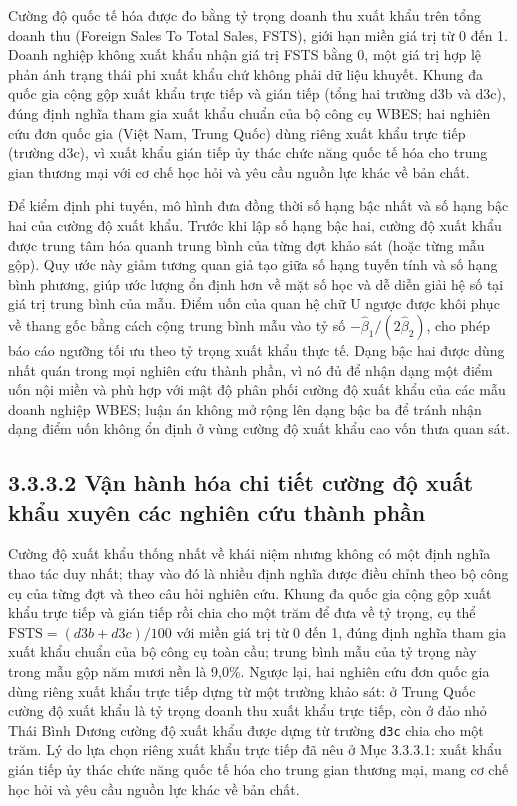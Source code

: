 \documentclass[
  a4paper,
  13pt]{extreport}
\begin{document}
Cường độ quốc tế hóa được đo bằng tỷ trọng doanh thu xuất khẩu trên tổng
doanh thu (Foreign Sales To Total Sales, FSTS), giới hạn miền giá trị từ
0 đến 1. Doanh nghiệp không xuất khẩu nhận giá trị FSTS bằng 0, một giá
trị hợp lệ phản ánh trạng thái phi xuất khẩu chứ không phải dữ liệu
khuyết. Khung đa quốc gia cộng gộp xuất khẩu trực tiếp và gián tiếp
(tổng hai trường d3b và d3c), đúng định nghĩa tham gia xuất khẩu chuẩn
của bộ công cụ WBES; hai nghiên cứu đơn quốc gia (Việt Nam, Trung Quốc)
dùng riêng xuất khẩu trực tiếp (trường d3c), vì xuất khẩu gián tiếp ủy
thác chức năng quốc tế hóa cho trung gian thương mại với cơ chế học hỏi
và yêu cầu nguồn lực khác về bản chất.

Để kiểm định phi tuyến, mô hình đưa đồng thời số hạng bậc nhất và số
hạng bậc hai của cường độ xuất khẩu. Trước khi lập số hạng bậc hai,
cường độ xuất khẩu được trung tâm hóa quanh trung bình của từng đợt khảo
sát (hoặc từng mẫu gộp). Quy ước này giảm tương quan giả tạo giữa số
hạng tuyến tính và số hạng bình phương, giúp ước lượng ổn định hơn về
mặt số học và dễ diễn giải hệ số tại giá trị trung bình của mẫu. Điểm
uốn của quan hệ chữ U ngược được khôi phục về thang gốc bằng cách cộng
trung bình mẫu vào tỷ số \(-\hat\beta_1 / (2\hat\beta_2)\), cho phép báo
cáo ngưỡng tối ưu theo tỷ trọng xuất khẩu thực tế. Dạng bậc hai được
dùng nhất quán trong mọi nghiên cứu thành phần, vì nó đủ để nhận dạng
một điểm uốn nội miền và phù hợp với mật độ phân phối cường độ xuất khẩu
của các mẫu doanh nghiệp WBES; luận án không mở rộng lên dạng bậc ba để
tránh nhận dạng điểm uốn không ổn định ở vùng cường độ xuất khẩu cao vốn
thưa quan sát.

\hypertarget{vux1eadn-huxe0nh-huxf3a-chi-tiux1ebft-cux1b0ux1eddng-ux111ux1ed9-xuux1ea5t-khux1ea9u-xuyuxean-cuxe1c-nghiuxean-cux1ee9u-thuxe0nh-phux1ea7n}{%
\subsection{3.3.3.2 Vận hành hóa chi tiết cường độ xuất khẩu xuyên các
nghiên cứu thành
phần}\label{vux1eadn-huxe0nh-huxf3a-chi-tiux1ebft-cux1b0ux1eddng-ux111ux1ed9-xuux1ea5t-khux1ea9u-xuyuxean-cuxe1c-nghiuxean-cux1ee9u-thuxe0nh-phux1ea7n}}

Cường độ xuất khẩu thống nhất về khái niệm nhưng không có một định nghĩa
thao tác duy nhất; thay vào đó là nhiều định nghĩa được điều chỉnh theo
bộ công cụ của từng đợt và theo câu hỏi nghiên cứu. Khung đa quốc gia
cộng gộp xuất khẩu trực tiếp và gián tiếp rồi chia cho một trăm để đưa
về tỷ trọng, cụ thể \(\mathrm{FSTS} = (d3b + d3c)/100\) với miền giá trị
từ 0 đến 1, đúng định nghĩa tham gia xuất khẩu chuẩn của bộ công cụ toàn
cầu; trung bình mẫu của tỷ trọng này trong mẫu gộp năm mươi nền là
9,0\%. Ngược lại, hai nghiên cứu đơn quốc gia dùng riêng xuất khẩu trực
tiếp dựng từ một trường khảo sát: ở Trung Quốc cường độ xuất khẩu là tỷ
trọng doanh thu xuất khẩu trực tiếp, còn ở đảo nhỏ Thái Bình Dương cường
độ xuất khẩu được dựng từ trường \texttt{d3c} chia cho một trăm. Lý do
lựa chọn riêng xuất khẩu trực tiếp đã nêu ở Mục 3.3.3.1: xuất khẩu gián
tiếp ủy thác chức năng quốc tế hóa cho trung gian thương mại, mang cơ
chế học hỏi và yêu cầu nguồn lực khác về bản chất.
\end{document}
